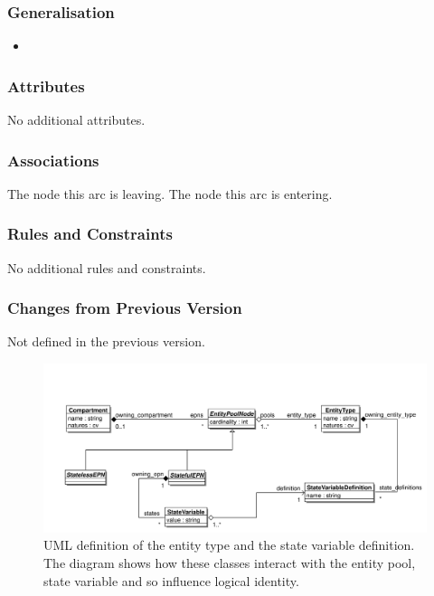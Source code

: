 \subsubsection{Generalisation}

\begin{itemize}
\item {}
\end{itemize}

\subsubsection{Attributes}

No additional attributes.

\subsubsection{Associations}

\begin{attributes}
   The node this arc is leaving.
   The node this arc is entering.
\end{attributes}

\subsubsection{Rules and Constraints}

No additional rules and constraints.

\subsubsection{Changes from Previous Version}

Not defined in the previous version.


\label{defn:EntityType}

\begin{figure}[htb]
  \centering
  \includegraphics[width=\textwidth]{images/entitytypeuml}
\caption{UML definition of the entity type and the state variable
  definition. The diagram shows how these classes interact with the
  entity pool, state variable and so influence
   logical identity.}
  \label{fig:techref:entitytypeuml}
\end{figure}

